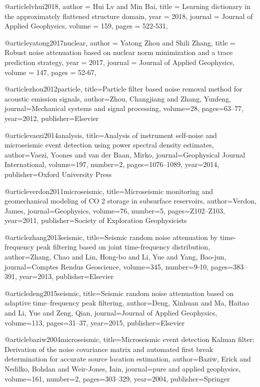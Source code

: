 @article{lvhui2018,
  author =	 {Hui Lv and Min Bai},
  title =	 {Learning dictionary in the approximately flattened structure domain},
  year =	 2018,
  journal =	 {Journal of Applied Geophysics},
  volume =	 159,
  pages =	 {522-531},
}



@article{yatong2017nuclear,
  author =	 {Yatong Zhou and Shili Zhang},
  title =	 {Robust noise attenuation based on nuclear norm minimization and a trace prediction strategy},
  year =	 2017,
  journal =	 {Journal of Applied Geophysics},
  volume =	 147,
  pages =	 {52-67},
}

@article{zhou2012particle,
  title={Particle filter based noise removal method for acoustic emission signals},
  author={Zhou, Changjiang and Zhang, Yunfeng},
  journal={Mechanical systems and signal processing},
  volume={28},
  pages={63--77},
  year={2012},
  publisher={Elsevier}
}

@article{vaezi2014analysis,
  title={Analysis of instrument self-noise and microseismic event detection using power spectral density estimates},
  author={Vaezi, Yoones and van der Baan, Mirko},
  journal={Geophysical Journal International},
  volume={197},
  number={2},
  pages={1076--1089},
  year={2014},
  publisher={Oxford University Press}
}

  @article{verdon2011microseismic,
  title={Microseismic monitoring and geomechanical modeling of CO 2 storage in subsurface reservoirs},
  author={Verdon, James},
  journal={Geophysics},
  volume={76},
  number={5},
  pages={Z102--Z103},
  year={2011},
  publisher={Society of Exploration Geophysicists}
}

@article{zhang2013seismic,
  title={Seismic random noise attenuation by time-frequency peak filtering based on joint time-frequency distribution},
  author={Zhang, Chao and Lin, Hong-bo and Li, Yue and Yang, Bao-jun},
  journal={Comptes Rendus Geoscience},
  volume={345},
  number={9-10},
  pages={383--391},
  year={2013},
  publisher={Elsevier}
}

@article{deng2015seismic,
  title={Seismic random noise attenuation based on adaptive time--frequency peak filtering},
  author={Deng, Xinhuan and Ma, Haitao and Li, Yue and Zeng, Qian},
  journal={Journal of Applied Geophysics},
  volume={113},
  pages={31--37},
  year={2015},
  publisher={Elsevier}
}

@article{baziw2004microseismic,
  title={Microseismic event detection Kalman filter: Derivation of the noise covariance matrix and automated first break determination for accurate source location estimation},
  author={Baziw, Erick and Nedilko, Bohdan and Weir-Jones, Iain},
  journal={pure and applied geophysics},
  volume={161},
  number={2},
  pages={303--329},
  year={2004},
  publisher={Springer}
}

